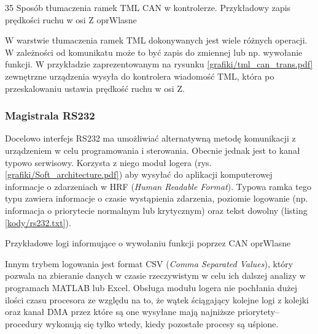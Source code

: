	{35}
	{Sposób tłumaczenia ramek TML CAN w kontrolerze. Przykładowy zapis prędkości ruchu w osi Z}
	{oprWlasne}
	
W warstwie tłumaczenia ramek TML dokonywanych jest wiele różnych operacji. W zależności od komunikatu może to być zapis do zmiennej lub np. wywołanie funkcji. W przykładzie zaprezentowanym na rysunku \ref{grafiki/tml_can_trans.pdf} zewnętrzne urządzenia wysyła do kontrolera wiadomość TML, która po przeskalowaniu ustawia prędkość ruchu w osi Z.

\subsubsection{Magistrala RS232}
\label{ss:hwrs232}

Docelowo interfejs RS232 ma umożliwiać alternatywną metodę komunikacji z urządzeniem w celu programowania i sterowania. Obecnie jednak jest to kanał typowo serwisowy. Korzysta z niego moduł logera (rys. \ref{grafiki/Soft_architecture.pdf}) aby wysyłać do aplikacji komputerowej informacje o zdarzeniach w HRF ({\it Human Readable Format}). Typowa ramka tego typu zawiera informacje o czasie wystąpienia zdarzenia, poziomie logowanie (np. informacja o priorytecie normalnym lub krytycznym) oraz tekst dowolny (listing \ref{kody/rs232.txt}). 

		   {}
		   {Przykładowe logi informujące o wywołaniu funkcji poprzez CAN}
		   {oprWlasne}
		   
Innym trybem logowania jest format CSV ({\it Comma Separated Values}), który pozwala na zbieranie danych w czasie rzeczywistym w celu ich dalszej analizy w programach MATLAB lub Excel. Obsługa modułu logera nie pochłania dużej ilości czasu procesora ze względu na to, że wątek ściągający kolejne logi z kolejki oraz kanał DMA przez które są one wysyłane mają najniższe priorytety-- procedury wykonują się tylko wtedy, kiedy pozostałe procesy są uśpione.



\clearpage







